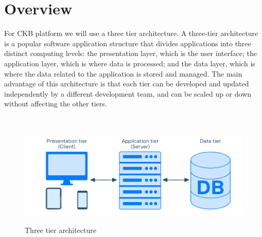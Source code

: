 \section{ Overview}
For CKB platform we will use a three tier architecture. A three-tier architecture is a popular software application structure that divides applications into three distinct computing levels: the presentation layer, which is the user interface; the application layer, which is where data is processed; and the data layer, which is where the data related to the application is stored and managed. The main advantage of this architecture is that each tier can be developed and updated independently by a different development team, and can be scaled up or down without affecting the other tiers.\cite{threeTier}
\\
\\
\\
\begin{figure}[!h]
    \centering
    \includegraphics{Images/three tier architecture.png}
    \caption{Three tier architecture}\cite{three_Tier}
    \label{fig:three-tier}
\end{figure}

